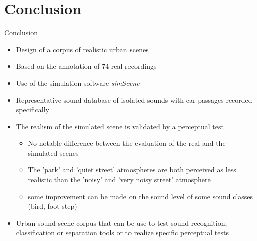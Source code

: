 \documentclass{beamer}
\begin{document}
\section{Conclusion}
\begin{frame}{Conclusion}

\begin{itemize}
\item Design of a corpus of realistic urban scenes 
\item Based on the annotation of 74 real recordings 
\item Use of the simulation software \textit{simScene}
\item Representative sound database of isolated sounds with car passages recorded specifically
\item The realism of the simulated scene is validated by a perceptual test
	\begin{itemize}
	\item No notable difference between the evaluation of the real and the simulated scenes
	\item The 'park' and 'quiet street' atmospheres are both perceived as less realistic than the 'noisy' and 'very noisy street' atmosphere
	\item some improvement can be made on the sound level of some sound classes (bird, foot step)
	\end{itemize}
\item Urban sound scene corpus that can be use to test sound recognition, classification or separation tools or to realize specific perceptual tests
\end{itemize}

\end{frame}

\begin{frame}

\titlepage

\end{frame}
\end{document}

